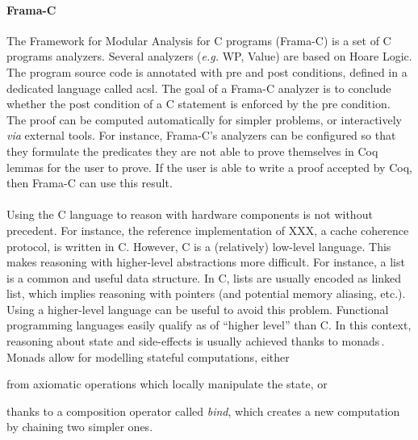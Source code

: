 \paragraph{Frama-C}
%
The Framework for Modular Analysis for C programs (Frama-C) is a set of C
programs analyzers.
%
Several analyzers (\emph{e.g.} WP, Value) are based on Hoare Logic.
%
The program source code is annotated with pre and post conditions, defined in a
dedicated language called \ac{acsl}.
%
The goal of a Frama-C analyzer is to conclude whether the post condition of a C
statement is enforced by the pre condition.
%
The proof can be computed automatically for simpler problems, or interactively
\emph{via} external tools.
%
For instance, Frama-C's analyzers can be configured so that they formulate the
predicates they are not able to prove themselves in Coq lemmas for the user to
prove.
%
If the user is able to write a proof accepted by Coq, then Frama-C can use this
result.

\paragraph{}
%
Using the C language to reason with hardware components is not without precedent.
%
For instance, the reference implementation of XXX, a cache coherence protocol, is written in C.
%
However, C is a (relatively) low-level language.
%
This makes reasoning with higher-level abstractions more difficult.
%
For instance, a list is a common and useful data structure.
%
In C, lists are usually encoded as linked list, which implies reasoning with
pointers (and potential memory aliasing, etc.).
%
Using a higher-level language can be useful to avoid this problem.
%
Functional programming languages easily qualify as of ``higher level'' than C.
%
In this context, reasoning about state and side-effects is usually achieved
thanks to monads\,\cite{jones2005io}.
%
Monads allow for modelling stateful computations,
either \begin{inparaenum}[(1)]
%
\item from axiomatic operations which locally manipulate the state, or
%
\item thanks to a composition operator called \emph{bind}, which creates
  a new computation by chaining two simpler ones.
%
\end{inparaenum}

